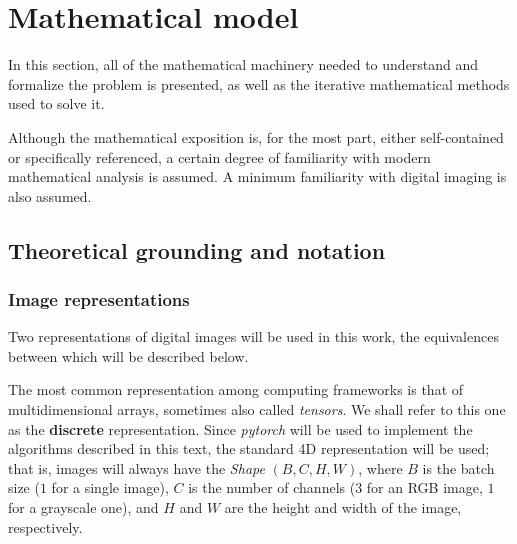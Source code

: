 \documentclass[twocolumn,twoside,a4paper,10pt]{IEEEtran}
\begin{document}

\section{Mathematical model}

In this section, all of the mathematical machinery needed to understand and formalize the problem is presented, as well as the iterative mathematical methods used to solve it.

Although the mathematical exposition is, for the most part, either self-contained or specifically referenced, a certain degree of familiarity with modern mathematical analysis is assumed. A minimum familiarity with digital imaging is also assumed.
\subsection{Theoretical grounding and notation}\label{subsec:theoretical-grounding}
\subsubsection{Image representations}

Two representations of digital images will be used in this work, the equivalences between which will be described below.

The most common representation among computing frameworks is that of multidimensional arrays, sometimes also called \textit{tensors}. We shall refer to this one as the \textbf{discrete} representation. Since \textit{pytorch} will be used to implement the algorithms described in this text, the standard 4D representation will be used; that is, images will always have the \textit{Shape} \((B, C, H, W)\), where \(B\) is the batch size (\(1\) for a single image), \(C\) is the number of channels (\(3\) for an RGB image, \(1\) for a grayscale one), and \(H\) and \(W\) are the height and width of the image, respectively.
\end{document}
